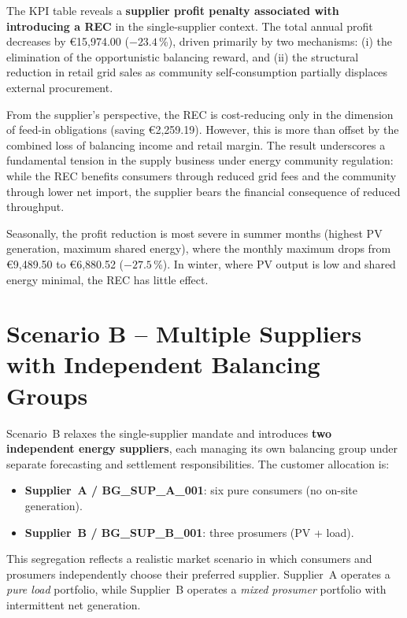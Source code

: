 The KPI table reveals a \textbf{supplier profit penalty associated with
introducing a REC} in the single-supplier context.  The total annual profit
decreases by €15{,}974.00 ($-23.4$\,\%), driven primarily by two mechanisms:
(i) the elimination of the opportunistic balancing reward, and
(ii) the structural reduction in retail grid sales as community self-consumption
partially displaces external procurement.

From the supplier's perspective, the REC is cost-reducing only in the dimension
of feed-in obligations (saving €2{,}259.19).  However, this is more than offset
by the combined loss of balancing income and retail margin.  The result
underscores a fundamental tension in the supply business under energy community
regulation: while the REC benefits consumers through reduced grid fees and the
community through lower net import, the supplier bears the financial consequence
of reduced throughput.

Seasonally, the profit reduction is most severe in summer months (highest PV
generation, maximum shared energy), where the monthly maximum drops from
€9{,}489.50 to €6{,}880.52 ($-27.5$\,\%).  In winter, where PV output is low
and shared energy minimal, the REC has little effect.

\section{Scenario B -- Multiple Suppliers with Independent Balancing Groups}
\label{sec:results_B}

Scenario~B relaxes the single-supplier mandate and introduces \textbf{two
independent energy suppliers}, each managing its own balancing group under
separate forecasting and settlement responsibilities.  The customer allocation
is:
\begin{itemize}
    \item \textbf{Supplier~A / BG\_SUP\_A\_001}: six pure consumers (no on-site
          generation).
    \item \textbf{Supplier~B / BG\_SUP\_B\_001}: three prosumers (PV + load).
\end{itemize}

This segregation reflects a realistic market scenario in which consumers and
prosumers independently choose their preferred supplier.  Supplier~A operates a
\emph{pure load} portfolio, while Supplier~B operates a \emph{mixed
prosumer} portfolio with intermittent net generation.

